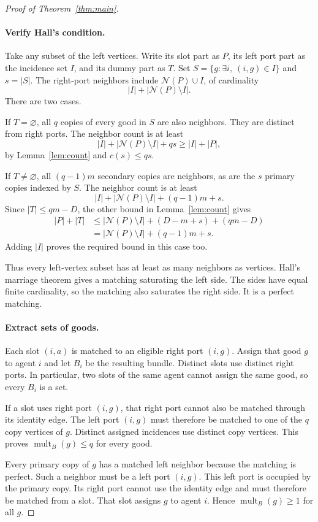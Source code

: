 \documentclass[11pt,a4paper]{article}
\newcommand{\mult}{\operatorname{mult}}
\newcommand{\nbr}{\mathcal N}
\begin{document}
\begin{proof}[Proof of Theorem~\ref{thm:main}]
\paragraph{Verify Hall's condition.}
Take any subset of the left vertices. Write its slot part as $P$, its left
port part as the incidence set $I$, and its dummy part as $T$.
Set $S=\{g:\exists i,\ (i,g)\in I\}$ and $s=|S|$.
The right-port neighbors include $\nbr(P)\cup I$, of cardinality
\[
 |I|+|\nbr(P)\setminus I|.
\]
There are two cases.

If $T=\varnothing$, all $q$ copies of every good in $S$ are also neighbors.
They are distinct from right ports. The neighbor count is at least
\[
 |I|+|\nbr(P)\setminus I|+qs\ge |I|+|P|,
\]
by Lemma~\ref{lem:count} and $c(s)\le qs$.

If $T\ne\varnothing$, all $(q-1)m$ secondary copies are neighbors, as are
the $s$ primary copies indexed by $S$. The neighbor count is at least
\[
 |I|+|\nbr(P)\setminus I|+(q-1)m+s.
\]
Since $|T|\le qm-D$, the other bound in Lemma~\ref{lem:count} gives
\begin{align*}
 |P|+|T|
 &\le |\nbr(P)\setminus I|+(D-m+s)+(qm-D)\\
 &=|\nbr(P)\setminus I|+(q-1)m+s.
\end{align*}
Adding $|I|$ proves the required bound in this case too.

Thus every left-vertex subset has at least as many neighbors as vertices.
Hall's marriage theorem gives a matching saturating the left side.
The sides have equal finite cardinality, so the matching also saturates the
right side. It is a perfect matching.

\paragraph{Extract sets of goods.}
Each slot $(i,a)$ is matched to an eligible right port $(i,g)$.
Assign that good $g$ to agent $i$ and let $B_i$ be the resulting bundle.
Distinct slots use distinct right ports. In particular, two slots of the
same agent cannot assign the same good, so every $B_i$ is a set.

If a slot uses right port $(i,g)$, that right port cannot also be matched
through its identity edge. The left port $(i,g)$ must therefore be matched
to one of the $q$ copy vertices of $g$. Distinct assigned incidences use
distinct copy vertices. This proves $\mult_B(g)\le q$ for every good.

Every primary copy of $g$ has a matched left neighbor because the matching
is perfect. Such a neighbor must be a left port $(i,g)$.
This left port is occupied by the primary copy. Its right port cannot use
the identity edge and must therefore be matched from a slot.
That slot assigns $g$ to agent $i$. Hence $\mult_B(g)\ge1$ for all $g$.


\end{proof}
\end{document}
